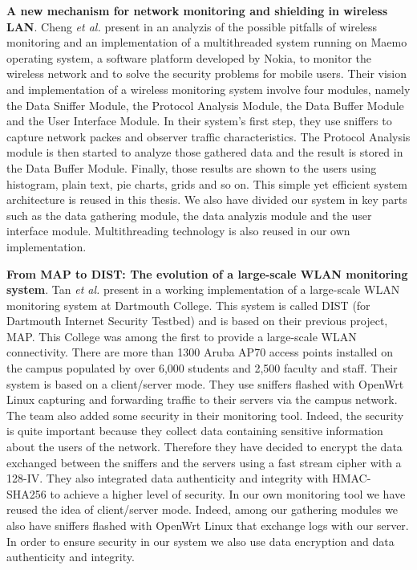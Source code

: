 \textbf{A new mechanism for network monitoring and shielding in wireless LAN}. Cheng \textit{et al.} present in \cite{article2} an analyzis of the possible pitfalls of wireless monitoring and an implementation of a multithreaded system running on Maemo operating system, a software platform developed by Nokia, to monitor the wireless network and to solve the security problems for mobile users. Their vision and implementation of a wireless monitoring system involve four modules, namely the Data Sniffer Module, the Protocol Analysis Module, the Data Buffer Module and the User Interface Module. In their system's first step, they use sniffers to capture network packes and observer traffic characteristics. The Protocol Analysis module is then started to analyze those gathered data and the result is stored in the Data Buffer Module. Finally, those results are shown to the users using histogram, plain text, pie charts, grids and so on. This simple yet efficient system architecture is reused in this thesis. We also have divided our system in key parts such as the data gathering module, the data analyzis module and the user interface module. Multithreading technology is also reused in our own implementation.

\textbf{From MAP to DIST: The evolution of a large-scale WLAN monitoring system}. Tan \textit{et al.} present in \citep{article3} a working implementation of a large-scale WLAN monitoring system at Dartmouth College. This system is called DIST (for Dartmouth Internet Security Testbed) and is based on their previous project, MAP. This College was among the first to provide a large-scale WLAN connectivity. There are more than 1300 Aruba AP70 access points installed on the campus populated by over 6,000 students and 2,500 faculty and staff. Their system is based on a client/server mode. They use sniffers flashed with OpenWrt Linux capturing and forwarding traffic to their servers via the campus network. The team also added some security in their monitoring tool. Indeed, the security is quite important because they collect data containing sensitive information about the users of the network. Therefore they have decided to encrypt the data exchanged between the sniffers and the servers using a fast stream cipher with a 128-IV. They also integrated data authenticity and integrity with HMAC-SHA256 to achieve a higher level of security. In our own monitoring tool we have reused the idea of client/server mode. Indeed, among our gathering modules we also have sniffers flashed with OpenWrt Linux that exchange logs with our server. In order to ensure security in our system we also use data encryption and data authenticity and integrity.



